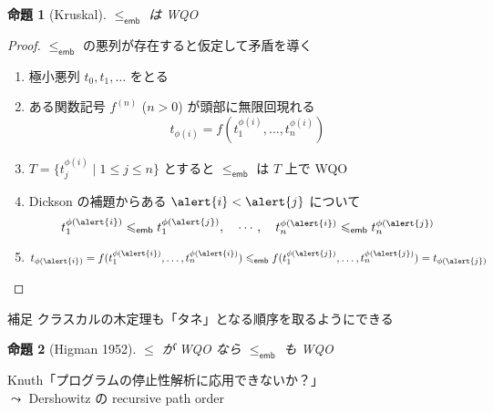 \documentclass{beamer}
\newtheorem{prop}{命題}
\newcommand{\emb}{\mathsf{emb}}
\begin{document}
\begin{frame}
\begin{prop}[Kruskal]
$\leqslant_\emb$ は WQO
\end{prop}
\begin{proof}
$\leqslant_\emb$ の悪列が存在すると仮定して矛盾を導く
\begin{enumerate}
\itemsep 0.5em
\item 極小悪列 $t_0, t_1, \ldots$ をとる
\item ある関数記号 $f^{(n)}$ ($n > 0$) が頭部に無限回現れる
\[
t_{\phi(i)} = f(t_{1}^{\phi(i)}, \ldots, t_{n}^{\phi(i)})
\]
\item $T = \{ t_{j}^{\phi(i)} \mid 1 \leqslant j \leqslant n \}$ とすると
$\leqslant_\emb$ は $T$ 上で WQO 

\item Dickson の補題からある $\alert{i} < \alert{j}$ について
\[
t_{1}^{\phi(\alert{i})} \leqslant_\emb t_{1}^{\phi(\alert{j})},
\quad
\cdots,
\quad
t_{n}^{\phi(\alert{i})} \leqslant_\emb t_{n}^{\phi(\alert{j})}
\]

\item $t_{\phi(\alert{i})} = f(t_{1}^{\phi(\alert{i})}, \ldots, t_{n}^{\phi(\alert{i})}) \leqslant_\emb f(t_{1}^{\phi(\alert{j})}, \ldots, t_{n}^{\phi(\alert{j})}) = t_{\phi(\alert{j})}$ \lightning
\end{enumerate}
\end{proof}
\end{frame}

\begin{frame}{補足}
クラスカルの木定理も「タネ」となる順序を取るようにできる
\begin{prop}[Higman 1952]
$\leqslant$ が WQO なら $\leqslant_\emb$ も WQO
\end{prop}
\vfill
Knuth「プログラムの停止性解析に応用できないか？」\\
\pause
$\leadsto$ Dershowitz の recursive path order
\end{frame}
\end{document}
